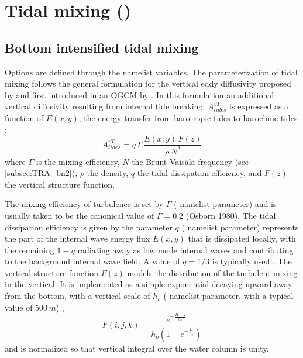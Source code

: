 \documentclass[../tex_main/NEMO_manual]{subfiles}
\begin{document}
\section{Tidal mixing (\protect{})}
\label{sec:ZDF_tmx}

%


\subsection{Bottom intensified tidal mixing}
\label{subsec:ZDF_tmx_bottom}

Options are defined through the   namelist variables.
The parameterization of tidal mixing follows the general formulation for 
the vertical eddy diffusivity proposed by \citet{St_Laurent_al_GRL02} and 
first introduced in an OGCM by \citep{Simmons_al_OM04}. 
In this formulation an additional vertical diffusivity resulting from internal tide breaking, 
$A^{vT}_{tides}$ is expressed as a function of $E(x,y)$, the energy transfer from barotropic 
tides to baroclinic tides : 
\begin{equation} \label{eq:Ktides}
A^{vT}_{tides} =  q \,\Gamma \,\frac{ E(x,y) \, F(z) }{ \rho \, N^2 }
\end{equation}
where $\Gamma$ is the mixing efficiency, $N$ the Brunt-Vais\"{a}l\"{a} frequency 
(see \autoref{subsec:TRA_bn2}), $\rho$ the density, $q$ the tidal dissipation efficiency, 
and $F(z)$ the vertical structure function. 

The mixing efficiency of turbulence is set by $\Gamma$ ( namelist parameter)
and is usually taken to be the canonical value of $\Gamma = 0.2$ (Osborn 1980). 
The tidal dissipation efficiency is given by the parameter $q$ ( namelist parameter) 
represents the part of the internal wave energy flux $E(x, y)$ that is dissipated locally, 
with the remaining $1-q$ radiating away as low mode internal waves and 
contributing to the background internal wave field. A value of $q=1/3$ is typically used  
\citet{St_Laurent_al_GRL02}.
The vertical structure function $F(z)$ models the distribution of the turbulent mixing in the vertical. 
It is implemented as a simple exponential decaying upward away from the bottom, 
with a vertical scale of $h_o$ ( namelist parameter, with a typical value of $500\,m$) \citep{St_Laurent_Nash_DSR04}, 
\begin{equation} \label{eq:Fz}
F(i,j,k) = \frac{ e^{ -\frac{H+z}{h_o} } }{ h_o \left( 1- e^{ -\frac{H}{h_o} } \right) }
\end{equation}
and is normalized so that vertical integral over the water column is unity. 
\end{document}
